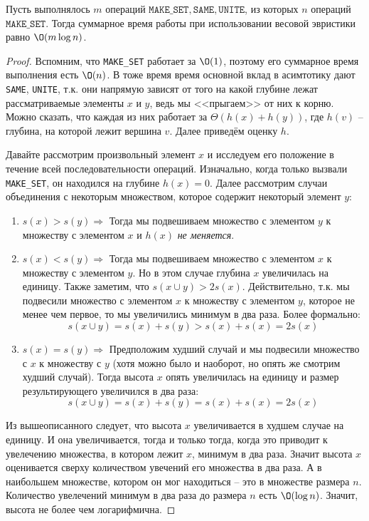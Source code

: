 \Th Пусть выполнялось $m$ операций $\texttt{MAKE\_SET}, \texttt{SAME}, \texttt{UNITE}$, из которых $n$ операций $\texttt{MAKE\_SET}$. Тогда суммарное время работы при использовании весовой эвристики равно $\O(m \log n)$.
\begin{proof}
    Вспомним, что \texttt{MAKE\_SET} работает за $\O(1)$, поэтому его суммарное время выполнения есть $\O(n)$. 
    В тоже время время основной вклад в асимтотику дают \texttt{SAME}, \texttt{UNITE}, т.к. они напрямую зависят от того на какой глубине лежат рассматриваемые элементы $x$ и $y$, ведь мы <<прыгаем>> от них к корню.
    Можно сказать, что каждая из них работает за $\Theta(h(x) + h(y))$, где $h(v)$ -- глубина, на которой лежит вершина $v$. Далее приведём оценку $h$.

    Давайте рассмотрим произвольный элемент $x$ и исследуем его положение в течение всей последовательности операций. Изначально, когда только вызвали \texttt{MAKE\_SET}, он находился на глубине $h(x) = 0$.
    Далее рассмотрим случаи объединения с некоторым множеством, которое содержит некоторый элемент $y$:
    \begin{enumerate}
        \item $s(x) > s(y) \Rightarrow$ Тогда мы подвешиваем множество с элементом $y$ к множеству с элементом $x$ и $h(x)$ \textit{не меняется}. 
        \item $s(x) < s(y) \Rightarrow$ Тогда мы подвешиваем множество с элементом $x$ к множеству с элементом $y$. Но в этом случае глубина $x$ увеличилась на единицу. Также заметим, что $s(x \cup y) > 2 s(x)$.
        Действительно, т.к. мы подвесили множество с элементом $x$ к множеству с элементом $y$, которое не менее чем первое, то мы увеличились минимум в два раза. Более формально:
        \begin{equation*}
            s(x \cup y) = s(x) + s(y) > s(x) + s(x) = 2s(x)
        \end{equation*}
        \item $s(x) = s(y) \Rightarrow$ Предположим худший случай и мы подвесили множество с $x$ к множеству с $y$ (хотя можно было и наоборот, но опять же смотрим худший случай). Тогда высота $x$ опять увеличилась на единицу и размер результирующего увеличился в два раза:
        \begin{equation*}
            s(x \cup y) = s(x) + s(y) = s(x) + s(x) = 2s(x)
        \end{equation*}
    \end{enumerate}

    Из вышеописанного следует, что высота $x$ увеличивается в худшем случае на единицу. И она увеличивается, тогда и только тогда, когда это приводит к увелечению множества, в котором лежит $x$, минимум в два раза.
    Значит высота $x$ оценивается сверху количеством увечений его множества в два раза. А в наибольшем множестве, котором он мог находиться -- это в множестве размера $n$.
    Количество увелечений минимум в два раза до размера $n$ есть $\O(\log n)$. Значит, высота не более чем логарифмична.


\end{proof}
